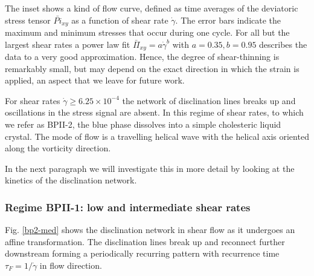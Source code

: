 \documentclass[aps,pre,reprint,superscriptaddress, twocolumn]{revtex4}
\newcommand{\e}[1]{\times10^{#1}}
\newcommand{\gd}{\dot{\gamma}}
\begin{document}
The inset shows a kind of flow curve, defined as time averages of 
the deviatoric stress tensor $\bar{Pi}_{xy}$ as a function of shear rate $\gd$.
The error bars indicate the maximum and minimum stresses that occur during one cycle.
For all but the largest shear rates a power law fit $\bar{\Pi}_{xy}=a \gd^b$ with 
$a=0.35, b=0.95$ describes the data to a very good approximation. 
Hence, the degree of shear-thinning is remarkably small, but may depend
on the exact direction in which the strain is applied, an aspect that we     
leave for future work.

For shear rates $\gd\ge6.25\e{-4}$ the network of disclination lines
breaks up and oscillations in the stress signal are absent.
In this regime of shear rates, to which we refer as BPII-2, the 
blue phase dissolves into a simple cholesteric liquid 
crystal. The mode of flow is a travelling helical wave with the helical axis 
oriented along the vorticity direction.

In the next paragraph we will investigate this in more detail by looking at the 
kinetics of the disclination network.

\subsubsection{Regime BPII-1: low and intermediate shear rates}

Fig. \ref{bp2-med} shows the disclination network in shear flow as
it undergoes an affine transformation. The disclination lines break up and 
reconnect further downstream forming a periodically recurring pattern with 
recurrence time $\tau_F=1/\gd$ in flow direction.
\end{document}
